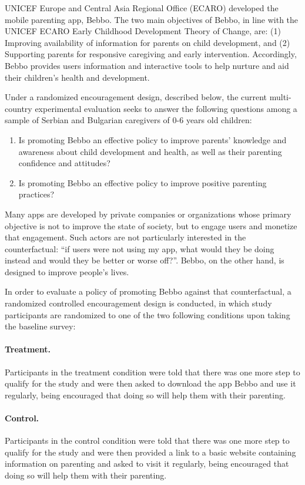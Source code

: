 \documentclass{article}
\begin{document}
UNICEF Europe and Central Asia Regional Office (ECARO) developed the mobile parenting app, Bebbo. The two main objectives of Bebbo, in line with the UNICEF ECARO Early Childhood Development Theory of Change, are: (1) Improving availability of information for parents on child development, and (2) Supporting parents for responsive caregiving and early intervention. Accordingly, Bebbo provides users information and interactive tools to help nurture and aid their children’s health and development.

Under a randomized encouragement design, described below, the current multi-country experimental evaluation seeks to answer the following questions among a sample of Serbian and Bulgarian caregivers of 0-6 years old children:

\begin{enumerate}
\item Is promoting Bebbo an effective policy to improve parents’ knowledge and awareness about child development and health, as well as their parenting confidence and attitudes?
\item Is promoting Bebbo an effective policy to  improve positive parenting practices?
\end{enumerate}

Many apps are developed by private companies or organizations whose primary objective is not to improve the state of society, but to engage users and monetize that engagement. Such actors are not particularly interested in the counterfactual: “if users were not using my app, what would they be doing instead and would they be better or worse off?”. Bebbo, on the other hand, is designed to improve people’s lives.

In order to evaluate a policy of promoting Bebbo against that counterfactual, a randomized controlled encouragement design is conducted, in which study participants are randomized to one of the two following conditions upon taking the baseline survey:

\paragraph{Treatment.} Participants in the treatment condition were told that there was one more step to qualify for the study and were then asked to download the app Bebbo and use it regularly, being encouraged that doing so will help them with their parenting.
\paragraph{Control.} Participants in the control condition were told that there was one more step to qualify for the study and were then provided a link to a basic website containing information on parenting and asked to visit it regularly, being encouraged that doing so will help them with their parenting.
\end{document}
